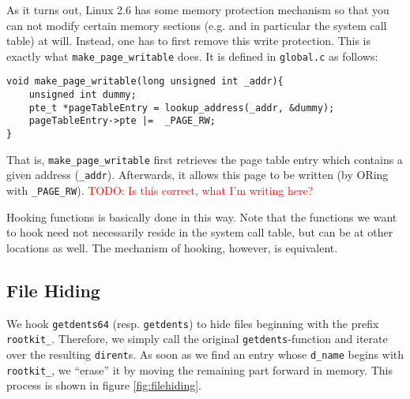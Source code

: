 \documentclass[10pt, letterpaper]{article}
\newcommand{\todo}[1]{\textcolor{red}{TODO: #1}}
\begin{document}
As it turns out, Linux 2.6 has some memory protection mechanism so that you can not modify certain memory sections (e.g. and in particular the system call table) at will. Instead, one has to first remove this write protection. This is exactly what \texttt{make\_page\_writable} does. It is defined in \texttt{global.c} as follows:

\begin{verbatim}
void make_page_writable(long unsigned int _addr){
    unsigned int dummy;
    pte_t *pageTableEntry = lookup_address(_addr, &dummy);
    pageTableEntry->pte |=  _PAGE_RW;
}
\end{verbatim}

That is, \texttt{make\_page\_writable} first retrieves the page table entry which contains a given address (\texttt{\_addr}). Afterwards, it allows this page to be written (by ORing with \texttt{\_PAGE\_RW}). \todo{Is this correct, what I'm writing here?}

Hooking functions is basically done in this way. Note that the functions we want to hook need not necessarily reside in the system call table, but can be at other locations as well. The mechanism of hooking, however, is equivalent.

\subsection{File Hiding}
\label{filehiding}
We hook \texttt{getdents64} (resp. \texttt{getdents}) to hide files beginning with the prefix \texttt{rootkit\_}. 
Therefore, we simply call the original \texttt{getdents}-function and iterate over the resulting
\texttt{dirent}s. As soon as we find an entry whose \texttt{d\_name} begins with \texttt{rootkit\_},
we ``erase'' it by moving the remaining part forward in memory. This process is shown in figure \ref{fig:filehiding}.
\end{document}
